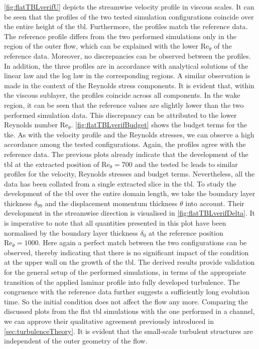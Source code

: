 \autoref{fig:flatTBLverifU} depicts the streamwise velocity profile in viscous scales.
It can be seen that the profiles of the two tested simulation configurations coincide over the entire height of the \acrshort{tbl}.
Furthermore, the profiles match the reference data.
The reference profile differs from the two performed simulations only in the region of the outer flow, which can be explained with the lower $\mathrm{Re}_{\theta}$ of the reference data.
Moreover, no discrepancies can be observed between the profiles.
In addition, the three profiles are in accordance with analytical solutions of the linear law and the log law in the corresponding regions.
A similar observation is made in the context of the Reynolds stress components.
It is evident that, within the viscous sublayer, the profiles coincide across all components.
In the wake region, it can be seen that the reference values are slightly lower than the two performed simulation data.
This discrepancy can be attributed to the lower Reynolds number $\mathrm{Re}_{\theta}$.
\autoref{fig:flatTBLverifBudget} shows the budget terms for the \acrshort{tke}.
As with the velocity profile and the Reynolds stresses, we can observe a high accordance among the tested configurations.
Again, the profiles agree with the reference data.
The previous plots already indicate that the development of the \acrshort{tbl} at the extracted position of $\mathrm{Re}_{\theta} = 700$ and the tested \acrshort{bc} leads to similar profiles for the velocity, Reynolds stresses and budget terms.
Nevertheless, all the data has been collated from a single extracted slice in the \acrshort{tbl}.
To study the development of the \acrshort{tbl} over the entire domain length, we take the boundary layer thickness $\delta_{99}$ and the displacement momentum thickness $\theta$ into account.
Their development in the streamwise direction is visualised in \autoref{fig:flatTBLverifDelta}.
It is imperative to note that all quantities presented in this plot have been normalised by the boundary layer thickness $\delta_0$ at the reference position $\mathrm{Re}_{\theta} = 1000$.
Here again a perfect match between the two configurations can be observed, thereby indicating that there is no significant impact of the  condition at the upper wall on the growth of the \acrshort{tbl}.
The derived results provide validation for the general setup of the performed simulations, in terms of the appropriate transition of the applied laminar profile into fully developed turbulence.
The congruence with the reference data further suggests a sufficiently long evolution time.
So the initial condition does not affect the flow any more.
Comparing the discussed plots from the flat \acrshort{tbl} simulations with the one performed in a channel, we can approve their qualitative agreement previously introduced in \autoref{sec:turbulenceTheory}.
It is evident that the small-scale turbulent structures are independent of the outer geometry of the flow.

